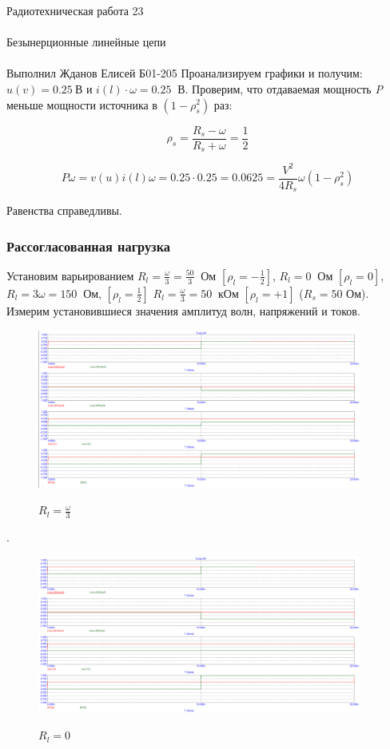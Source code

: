\documentclass{astroedu-lab}
\begin{document}
\begin{problem}{\huge Радиотехническая работа 23\\\\Безынерционные линейные цепи\\\\Выполнил Жданов Елисей Б01-205}
Проанализируем графики и получим: $u(v) = 0.25 \: \textit{В}$ и $i(l)\cdot \omega = 0.25 \: \textit{ В}$. Проверим, что отдаваемая мощность \textit{P} меньше мощности источника в $(1 - \rho_s^2)$ раз:

\[\rho_s = \frac{R_s - \omega}{R_s + \omega} = \frac{1}{2}\]

\[P\omega = v(u)i(l)\omega = 0.25 \cdot 0.25 = 0.0625 = \frac{V^2}{4R_s} \omega (1 - \rho_s^2)\]

Равенства справедливы.

\subsubsection{Рассогласованная нагрузка}

Установим варьированием $R_l = \frac{\omega}{3} = \frac{50}{3} \: \textit{ Ом}$ $[\rho_l = - \frac{1}{2}]$, $R_l = 0 \: \textit{ Ом}$ $[\rho_l = 0]$, $R_l = 3\omega = 150 \: \textit{ Ом}$, $[\rho_l =  \frac{1}{2}]$ $R_l = \frac{\omega}{3} = 50 \: \textit{ кОм}$ $[\rho_l =  +1]$ ($R_s = 50 \textit{ Ом}$). Измерим установившиеся значения амплитуд волн, напряжений и токов.

\begin{figure}[h!]
\centering
\includegraphics[width=0.95\textwidth]{картинки/Graph4.png}
\label{fig:Image1}
\caption{$R_l = \frac{\omega}{3}$}
\end{figure}

.

\begin{figure}[h!]
\centering
\includegraphics[width=0.95\textwidth]{картинки/Graph5.png}
\label{fig:Image1}
\caption{$R_l = 0$}
\end{figure}


\end{problem}
\end{document}
